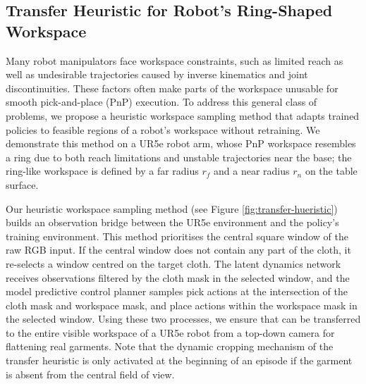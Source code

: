 \documentclass[journal]{IEEEtran}
\begin{document}
\subsection{Transfer Heuristic for Robot's Ring-Shaped Workspace} \label{sec:transfer-hueristic}
Many robot manipulators face workspace constraints, such as limited reach as well as undesirable trajectories caused by inverse kinematics and joint discontinuities. These factors often make parts of the workspace unusable for smooth pick-and-place (PnP) execution. To address this general class of problems, we propose a heuristic workspace sampling method that adapts trained policies to feasible regions of a robot’s workspace without retraining. We demonstrate this method on a UR5e robot arm, whose PnP workspace resembles a ring due to both reach limitations and unstable trajectories near the base; the ring-like workspace is defined by a far radius $r_f$ and a near radius $r_n$ on the table surface.



Our heuristic workspace sampling method (see Figure \ref{fig:transfer-hueristic}) builds an observation bridge between the UR5e environment and the policy's training environment. This method prioritises the central square window of the raw RGB input. If the central window does not contain any part of the cloth, it re-selects a window centred on the target cloth. The  latent dynamics network receives observations filtered by the cloth mask in the selected window, and the model predictive control planner samples pick actions at the intersection of the cloth mask and workspace mask, and place actions within the workspace mask in the selected window. Using these two processes, we ensure that  can be transferred to the entire visible workspace of a UR5e robot from a top-down camera for flattening real garments. Note that the dynamic cropping mechanism of the transfer heuristic is only activated at the beginning of an episode if the garment is absent from the central field of view.
\end{document}

